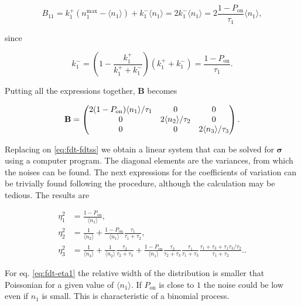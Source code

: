 \begin{equation*}
  B_{11} = k_1^+(n_1^\text{max}-\langle n_1\rangle)+k_1^-\langle n_1\rangle = 2k_1^-\langle n_1\rangle = 2\frac{1-P_\text{on}}{\tau_1}\langle n_1\rangle,
\end{equation*}

since

\begin{equation*}
  k_1^- = \left(1-\frac{k_1^+}{k_1^++k_1^-}\right)(k_1^++k_1^-)=\frac{1-P_\text{on}}{\tau_1}.
\end{equation*}

Putting all the expressions together, $\mathbf{B}$ becomes

\begin{equation}
  \label{eq:fdt-B}
  \mathbf{B} = 
  \begin{pmatrix}
    2(1-P_\text{on})\langle n_1\rangle/\tau_1 & 0 & 0 \\
    0 & 2\langle n_2\rangle/\tau_2 & 0 \\
    0 & 0 & 2\langle n_3\rangle/\tau_3
  \end{pmatrix}.\\
\end{equation}

Replacing on \eqref{eq:fdt-fdtss} we obtain a linear system that can be solved for $\mathbf{\sigma}$ using a computer program. The diagonal elements are the variances, from which the noises can be found. The next expressions for the coefficients of variation can be trivially found following the procedure, although the calculation may be tedious. The results are

\begin{align}
  \eta_1^2 &= \frac{1-P_\text{on}}{\langle n_1\rangle}, \label{eq:fdt-eta1}\\
  \eta_2^2 &= \frac{1}{\langle n_2\rangle}+\frac{1-P_\text{on}}{\langle n_1\rangle}\frac{\tau_1}{\tau_1+\tau_2}, \label{eq:fdt-eta2}\\
  \eta_3^2 &= \frac{1}{\langle n_3\rangle} + \frac{1}{\langle n_2\rangle}\frac{\tau_2}{\tau_2+\tau_3}+\frac{1-P_\text{on}}{\langle n_1\rangle}\frac{\tau_2}{\tau_2+\tau_3}\frac{\tau_1}{\tau_1+\tau_3}\frac{\tau_1+\tau_3+\tau_1\tau_3/\tau_2}{\tau_1+\tau_2}. \label{eq:fdt-eta3}.
\end{align}

For eq. \eqref{eq:fdt-eta1} the relative width of the distribution is smaller that Poissonian for a given value of $\langle n_1\rangle$. If $P_\text{on}$ is close to $1$ the noise could be low even if $n_1$ is small. This is characteristic of a binomial process.

